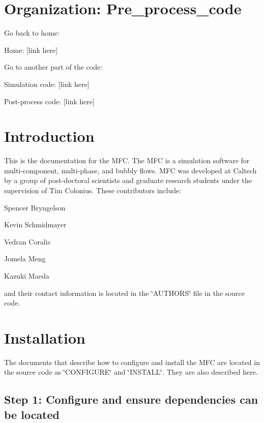 \hypertarget{index_org}{}\section{Organization\+: Pre\+\_\+process\+\_\+code}\label{index_org}
Go back to home\+: \begin{DoxyItemize}
\item Home\+: \mbox{[}link here\mbox{]}\end{DoxyItemize}
Go to another part of the code\+: \begin{DoxyItemize}
\item Simulation code\+: \mbox{[}link here\mbox{]} \item Post-\/process code\+: \mbox{[}link here\mbox{]}\end{DoxyItemize}
\hypertarget{index_intro_sec}{}\section{Introduction}\label{index_intro_sec}
This is the documentation for the M\+FC. The M\+FC is a simulation software for multi-\/component, multi-\/phase, and bubbly flows. M\+FC was developed at Caltech by a group of post-\/doctoral scientists and graduate research students under the supervision of Tim Colonius. These contributors include\+: \begin{DoxyItemize}
\item Spencer Bryngelson \item Kevin Schmidmayer \item Vedran Coralic \item Jomela Meng \item Kazuki Maeda\end{DoxyItemize}
and their contact information is located in the \char`\"{}\+A\+U\+T\+H\+O\+R\+S\char`\"{} file in the source code.\hypertarget{index_install_sec}{}\section{Installation}\label{index_install_sec}
The documents that describe how to configure and install the M\+FC are located in the source code as \char`\"{}\+C\+O\+N\+F\+I\+G\+U\+R\+E\char`\"{} and \char`\"{}\+I\+N\+S\+T\+A\+L\+L\char`\"{}. They are also described here.\hypertarget{index_step1}{}\subsection{Step 1\+: Configure and ensure dependencies can be located}\label{index_step1}
